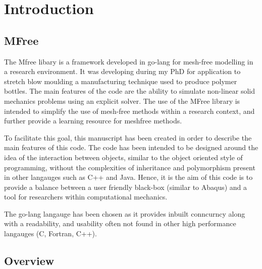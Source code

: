 \chapter{Introduction}
\section{MFree}
The Mfree libary is a framework developed in go-lang for mesh-free modelling in a research environment. It was developing during my PhD for application to stretch blow moulding a manufacturing technique used to produce polymer bottles. The main features of the code are the ability to simulate non-linear solid mechanics problems using an explicit solver. The use of the MFree library is intended to simplify the use of mesh-free methods within a research context, and further provide a learning resource for meshfree methods. 

To facilitate this goal, this manuscript has been created in order to describe the main features of this code. The code has been intended to be designed around the idea of the interaction between objects, similar to the object oriented style of programming, without the complexities of inheritance and polymorphism present in other langauges such as C++ and Java. Hence, it is the aim of this code is to provide a balance between a user friendly black-box (similar to Abaqus) and a tool for researchers within computational mechanics.

The go-lang langauge has been chosen as it provides inbuilt conncurncy along with a readability, and usability often not found in other high performance langauges (C, Fortran, C++).
\section{Overview}



